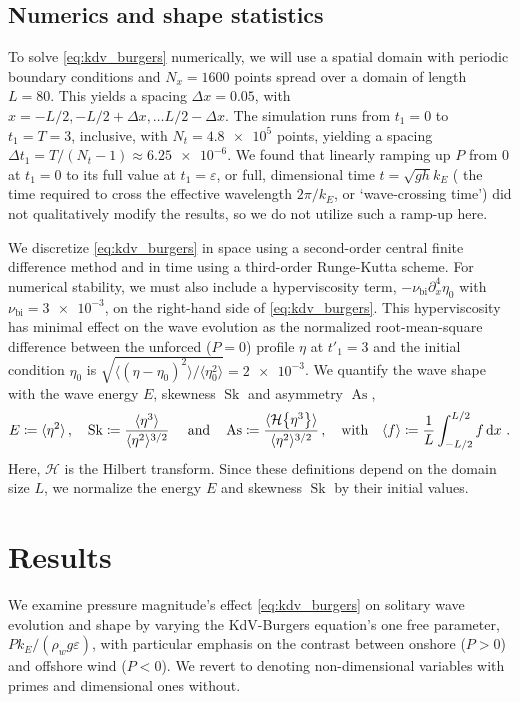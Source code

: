 \documentclass{jfm}
\DeclareMathOperator{\Sk}{Sk}
\DeclareMathOperator{\As}{As}
\newcommand{\hilbert}{\mathcal{H}}
\renewcommand*{\epsilon}{\varepsilon}
\begin{document}
\subsection{Numerics and shape statistics}
To solve \cref{eq:kdv_burgers} numerically,
we will use a spatial domain with periodic boundary conditions and $N_x
= 1600$ points spread over a domain of length $L = 80$.
This yields a spacing $\Delta x = 0.05$, with $x = -L/2,
-L/2 + \Delta x, \ldots L/2 - \Delta x$.
The simulation runs from $t_1 = 0$ to $t_1 = T = 3$, inclusive, with
$N_t = \num{4.8e5}$ points, yielding a spacing $\Delta t_1 = T/(N_t-1)
\approx \num{6.25e-6}$.
We found that linearly ramping up $P$ from $0$ at $t_1=0$ to its full
value at $t_1 = \epsilon$, or full, dimensional time $t = \sqrt{gh} k_E$
(\ie{} the time required to cross the effective wavelength $2\pi/k_E$,
or `wave-crossing time') did not qualitatively modify the results, so we
do not utilize such a ramp-up here.

We discretize \cref{eq:kdv_burgers} in space using a
second-order central finite difference method and in time using a
third-order Runge-Kutta scheme.
For numerical stability, we must also include a hyperviscosity term,
$-\nu_{\text{bi}} \partial_x^4 \eta_0$ with $\nu_{\text{bi}} =
\num{3e-3}$, on the right-hand side of \cref{eq:kdv_burgers}.
This hyperviscosity has minimal effect on the wave evolution as the
normalized root-mean-square difference between the unforced ($P=0$)
profile $\eta$ at $t'_1=3$ and the initial condition $\eta_0$ is
$\sqrt{\langle (\eta - \eta_0)^2 \rangle/ \langle \eta_0^2 \rangle} =
\num{2e-3}$.
We quantify the wave shape with the wave energy $E$, skewness $\Sk$ and
asymmetry $\As$,
\begin{equation}
  E \coloneqq \langle \eta^2 \rangle \,, \quad
  \Sk \coloneqq \frac{\langle \eta^3 \rangle}{\langle \eta^2
  \rangle^{3/2}} \
  \qq{and}
  \As \coloneqq \frac{\langle \hilbert \Bqty{\eta^3} \rangle}{\langle
    \eta^2 \rangle^{3/2}}
  \,, \qq{with}
  \langle f \rangle \coloneqq \frac{1}{L} \int_{-L/2}^{L/2} f
  \dd{x} \,.
  \label{eq:shape_stats_def}
\end{equation}
Here, $\hilbert$ is the Hilbert transform.
Since these definitions depend on the domain size $L$, we normalize the
energy $E$ and skewness $\Sk$ by their initial values.

\section{\label{sec:results} Results}
We examine pressure magnitude's effect \cref{eq:kdv_burgers} on solitary
wave evolution and shape by varying the KdV-Burgers equation's one free
parameter, $P k_E/(\rho_w g \epsilon)$, with particular emphasis on the
contrast between onshore ($P > 0$) and offshore wind ($P < 0$).
We revert to denoting non-dimensional variables with primes and
dimensional ones without.
\end{document}
